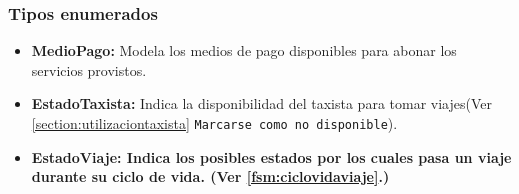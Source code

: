 \subsubsection{Tipos enumerados}
\begin{itemize}
	\item \textbf{MedioPago:} Modela los medios de pago disponibles para abonar los servicios provistos.
	\item \textbf{EstadoTaxista:} Indica la disponibilidad del taxista para tomar viajes(Ver \ref{section:utilizaciontaxista} \texttt{Marcarse como no disponible}).
	\item \textbf{EstadoViaje: Indica los posibles estados por los cuales pasa un viaje durante su ciclo de vida. (Ver \ref{fsm:ciclovidaviaje}.)}
\end{itemize}